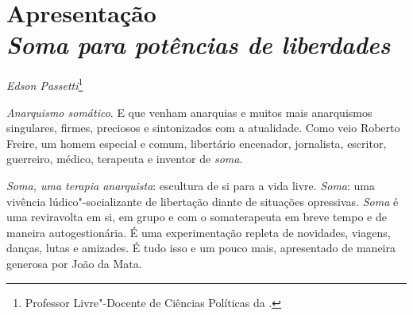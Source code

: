 



\chapter*{Apresentação\\ \emph{\emph{Soma} para potências de liberdades}}

\begin{flushright}
\emph{Edson Passetti}\footnote{Professor Livre"-Docente de Ciências Políticas da .}
\end{flushright}

\emph{Anarquismo somático}. E que venham anarquias e muitos mais
anarquismos singulares, firmes, preciosos e sintonizados com a
atualidade. Como veio Roberto Freire, um homem especial e comum,
libertário encenador, jornalista, escritor, guerreiro, médico, terapeuta
e inventor de \emph{soma}.

\emph{Soma, uma terapia anarquista}: escultura de si para a vida livre.
\emph{Soma}: uma vivência lúdico"-socializante de libertação diante de
situações opressivas. \emph{Soma} é uma reviravolta em si, em grupo e
com o somaterapeuta em breve tempo e de maneira autogestionária. É uma
experimentação repleta de novidades, viagens, danças, lutas e amizades.
É tudo isso e um pouco mais, apresentado de maneira generosa por João da
Mata.

